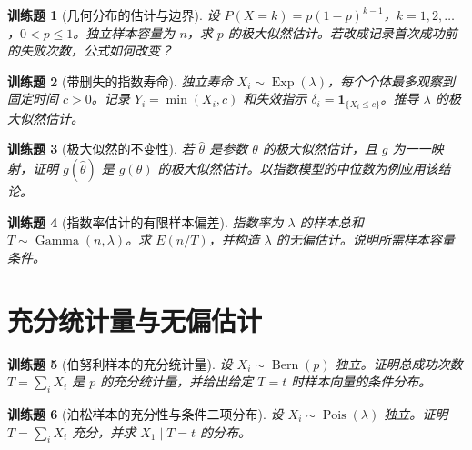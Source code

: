 \documentclass[UTF8,12pt,a4paper,fontset=fandol]{ctexbook}
\newtheorem{exercise}{训练题}[section]
\begin{document}
\begin{exercise}[几何分布的估计与边界]\label{q:B10.3}
设 $P(X=k)=p(1-p)^{k-1}$，$k=1,2,\ldots$，$0<p\le1$。独立样本容量为 $n$，求 $p$ 的极大似然估计。若改成记录首次成功前的失败次数，公式如何改变？\par{}\end{exercise}

\begin{exercise}[带删失的指数寿命]\label{q:B10.4}
独立寿命 $X_i\sim\operatorname{Exp}(\lambda)$，每个个体最多观察到固定时间 $c>0$。记录 $Y_i=\min(X_i,c)$ 和失效指示 $\delta_i=\mathbf1_{\{X_i\le c\}}$。推导 $\lambda$ 的极大似然估计。\par{}\end{exercise}

\begin{exercise}[极大似然的不变性]\label{q:B10.5}
若 $\widehat\theta$ 是参数 $\theta$ 的极大似然估计，且 $g$ 为一一映射，证明 $g(\widehat\theta)$ 是 $g(\theta)$ 的极大似然估计。以指数模型的中位数为例应用该结论。\par{}\end{exercise}

\begin{exercise}[指数率估计的有限样本偏差]\label{q:B10.6}
指数率为 $\lambda$ 的样本总和 $T\sim\operatorname{Gamma}(n,\lambda)$。求 $E(n/T)$，并构造 $\lambda$ 的无偏估计。说明所需样本容量条件。\par{}\end{exercise}

\clearpage\section{充分统计量与无偏估计}

\begin{exercise}[伯努利样本的充分统计量]\label{q:B11.1}
设 $X_i\sim\operatorname{Bern}(p)$ 独立。证明总成功次数 $T=\sum_iX_i$ 是 $p$ 的充分统计量，并给出给定 $T=t$ 时样本向量的条件分布。\par{}\end{exercise}

\begin{exercise}[泊松样本的充分性与条件二项分布]\label{q:B11.2}
设 $X_i\sim\operatorname{Pois}(\lambda)$ 独立。证明 $T=\sum_iX_i$ 充分，并求 $X_1\mid T=t$ 的分布。\par{}\end{exercise}
\end{document}
